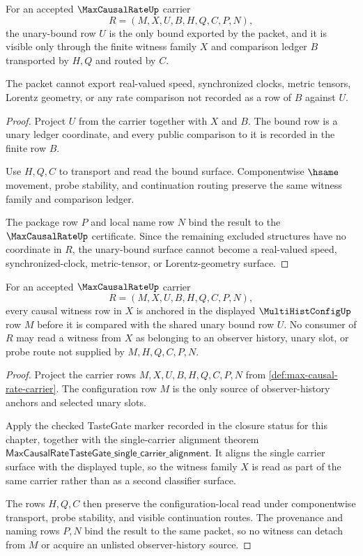 \begin{theorem}
\label{thm:max-causal-rate-unary-bound-nonescape}
For an accepted $\MaxCausalRateUp$ carrier
$$
R=(M,X,U,B,H,Q,C,P,N),
$$
the unary-bound row $U$ is the only bound exported by the packet, and it is visible only through the finite witness family $X$ and comparison ledger $B$ transported by $H,Q$ and routed by $C$.

The packet cannot export real-valued speed, synchronized clocks, metric tensors, Lorentz geometry, or any rate comparison not recorded as a row of $B$ against $U$.
\end{theorem}
\begin{proof}
Project $U$ from the carrier together with $X$ and $B$. The bound row is a unary ledger coordinate, and every public comparison to it is recorded in the finite row $B$.

Use $H,Q,C$ to transport and read the bound surface. Componentwise $\hsame$ movement, probe stability, and continuation routing preserve the same witness family and comparison ledger.

The package row $P$ and local name row $N$ bind the result to the $\MaxCausalRateUp$ certificate. Since the remaining excluded structures have no coordinate in $R$, the unary-bound surface cannot become a real-valued speed, synchronized-clock, metric-tensor, or Lorentz-geometry surface.
\end{proof}

\begin{theorem}
\label{thm:max-causal-rate-configuration-locality-obligation}
For an accepted $\MaxCausalRateUp$ carrier
$$
R=(M,X,U,B,H,Q,C,P,N),
$$
every causal witness row in $X$ is anchored in the displayed $\MultiHistConfigUp$ row $M$ before it is compared with the shared unary bound row $U$. No consumer of $R$ may read a witness from $X$ as belonging to an observer history, unary slot, or probe route not supplied by $M,H,Q,C,P,N$.
\end{theorem}
\begin{proof}
Project the carrier rows $M,X,U,B,H,Q,C,P,N$ from \autoref{def:max-causal-rate-carrier}. The configuration row $M$ is the only source of observer-history anchors and selected unary slots.

Apply the checked TasteGate marker recorded in the closure status for this chapter, together with the single-carrier alignment theorem $\mathsf{MaxCausalRateTasteGate\_single\_carrier\_alignment}$. It aligns the single carrier surface with the displayed tuple, so the witness family $X$ is read as part of the same carrier rather than as a second classifier surface.

The rows $H,Q,C$ then preserve the configuration-local read under componentwise transport, probe stability, and visible continuation routes. The provenance and naming rows $P,N$ bind the result to the same packet, so no witness can detach from $M$ or acquire an unlisted observer-history source.
\end{proof}

